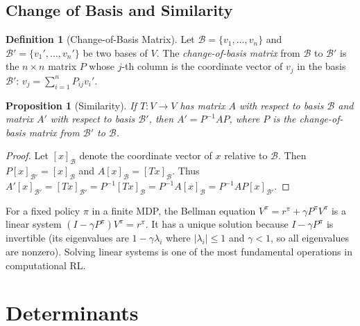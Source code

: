 \documentclass[11pt,a4paper]{article}
\theoremstyle{definition}
\newtheorem{definition}{Definition}[section]
\theoremstyle{plain}
\newtheorem{proposition}[theorem]{Proposition}
\theoremstyle{remark}
\begin{document}
\subsection{Change of Basis and Similarity}
\label{subsec:change_of_basis}

\begin{definition}[Change-of-Basis Matrix]
\label{def:change_basis}
Let $\mathcal{B} = \{v_1, \ldots, v_n\}$ and $\mathcal{B}' = \{v_1', \ldots, v_n'\}$ be
two bases of $V$. The \emph{change-of-basis matrix} from $\mathcal{B}$ to $\mathcal{B}'$
is the $n \times n$ matrix $P$ whose $j$-th column is the coordinate vector of $v_j$
in the basis $\mathcal{B}'$: $v_j = \sum_{i=1}^n P_{ij} v_i'$.
\end{definition}

\begin{proposition}[Similarity]
\label{prop:similarity}
If $T: V \to V$ has matrix $A$ with respect to basis $\mathcal{B}$ and matrix $A'$
with respect to basis $\mathcal{B}'$, then $A' = P^{-1}AP$, where $P$ is the
change-of-basis matrix from $\mathcal{B}'$ to $\mathcal{B}$.
\end{proposition}

\begin{proof}
Let $[x]_\mathcal{B}$ denote the coordinate vector of $x$ relative to $\mathcal{B}$.
Then $P[x]_{\mathcal{B}'} = [x]_\mathcal{B}$ and $A[x]_\mathcal{B} = [Tx]_\mathcal{B}$.
Thus $A'[x]_{\mathcal{B}'} = [Tx]_{\mathcal{B}'} = P^{-1}[Tx]_\mathcal{B}
= P^{-1}A[x]_\mathcal{B} = P^{-1}AP[x]_{\mathcal{B}'}$.
\end{proof}

\begin{rlconnection}
For a fixed policy $\pi$ in a finite MDP, the Bellman equation $V^\pi = r^\pi + \gamma P^\pi V^\pi$
is a linear system $(I - \gamma P^\pi) V^\pi = r^\pi$. It has a unique solution because
$I - \gamma P^\pi$ is invertible (its eigenvalues are $1 - \gamma \lambda_i$ where $|\lambda_i| \leq 1$
and $\gamma < 1$, so all eigenvalues are nonzero). Solving linear systems is one of the most
fundamental operations in computational RL.
\end{rlconnection}

\section{Determinants}
\label{sec:determinants}
\end{document}
